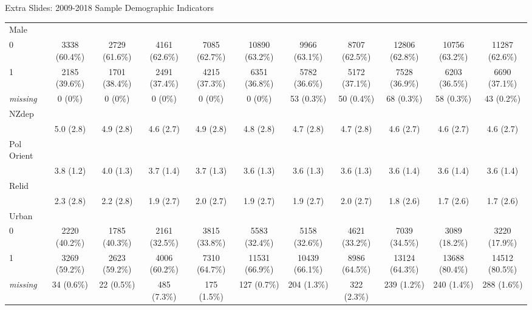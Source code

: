 \documentclass{beamer}
\begin{document}
\begin{frame}{Extra Slides: 2009-2018 Sample Demographic Indicators}
\begin{table}
{\begin{tabular}{ l c c c c c c c c c c }
Male &   &   &   &   &   &   &   &   &   &  \\ 
\hspace{6pt}    0 & 3338 (60.4\%) & 2729 (61.6\%) & 4161 (62.6\%) & 7085 (62.7\%) & 10890 (63.2\%) & 9966 (63.1\%) & 8707 (62.5\%) & 12806 (62.8\%) & 10756 (63.2\%) & 11287 (62.6\%)\\ 
\hspace{6pt}    1 & 2185 (39.6\%) & 1701 (38.4\%) & 2491 (37.4\%) & 4215 (37.3\%) & 6351 (36.8\%) & 5782 (36.6\%) & 5172 (37.1\%) & 7528 (36.9\%) & 6203 (36.5\%) & 6690 (37.1\%)\\ 
\hspace{6pt}    \emph{missing} & 0 (0\%) & 0 (0\%) & 0 (0\%) & 0 (0\%) & 0 (0\%) & 53 (0.3\%) & 50 (0.4\%) & 68 (0.3\%) & 58 (0.3\%) & 43 (0.2\%)\\ 
NZdep &   &   &   &   &   &   &   &   &   &  \\ 
\hspace{6pt}   & 5.0 (2.8) & 4.9 (2.8) & 4.6 (2.7) & 4.9 (2.8) & 4.8 (2.8) & 4.7 (2.8) & 4.7 (2.8) & 4.6 (2.7) & 4.6 (2.7) & 4.6 (2.7)\\ 
Pol Orient &   &   &   &   &   &   &   &   &   &  \\ 
\hspace{6pt}   & 3.8 (1.2) & 4.0 (1.3) & 3.7 (1.4) & 3.7 (1.3) & 3.6 (1.3) & 3.6 (1.3) & 3.6 (1.3) & 3.6 (1.4) & 3.6 (1.4) & 3.6 (1.4)\\ 
Relid &   &   &   &   &   &   &   &   &   &  \\ 
\hspace{6pt}   & 2.3 (2.8) & 2.2 (2.8) & 1.9 (2.7) & 2.0 (2.7) & 1.9 (2.7) & 1.9 (2.7) & 2.0 (2.7) & 1.8 (2.6) & 1.7 (2.6) & 1.7 (2.6)\\ 
Urban &   &   &   &   &   &   &   &   &   &  \\ 
\hspace{6pt}    0 & 2220 (40.2\%) & 1785 (40.3\%) & 2161 (32.5\%) & 3815 (33.8\%) & 5583 (32.4\%) & 5158 (32.6\%) & 4621 (33.2\%) & 7039 (34.5\%) & 3089 (18.2\%) & 3220 (17.9\%)\\ 
\hspace{6pt}    1 & 3269 (59.2\%) & 2623 (59.2\%) & 4006 (60.2\%) & 7310 (64.7\%) & 11531 (66.9\%) & 10439 (66.1\%) & 8986 (64.5\%) & 13124 (64.3\%) & 13688 (80.4\%) & 14512 (80.5\%)\\ 
\hspace{6pt}    \emph{missing} & 34 (0.6\%) & 22 (0.5\%) & 485 (7.3\%) & 175 (1.5\%) & 127 (0.7\%) & 204 (1.3\%) & 322 (2.3\%) & 239 (1.2\%) & 240 (1.4\%) & 288 (1.6\%)\\ 
\bottomrule

\end{tabular}
}
\end{table}

\end{frame}
\end{document}
